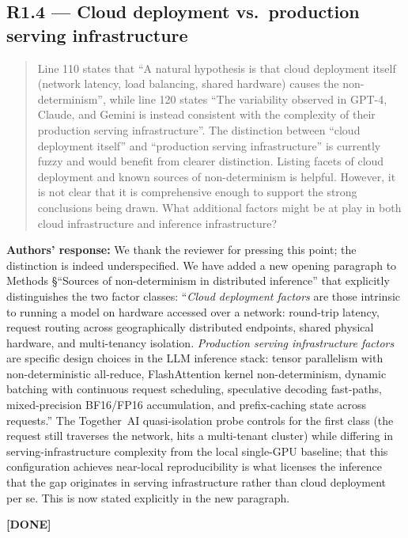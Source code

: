 \documentclass[11pt,a4paper]{article}
\newenvironment{revquote}{%
  \begin{quote}\small\itshape\color{revgray}
}{%
  \end{quote}
}
\newcommand{\response}[1]{\par\noindent\textbf{\color{revgreen}Authors' response:} #1\par}
\newcommand{\done}{\color{revgreen}\textbf{[DONE]}}
\begin{document}
\subsection*{R1.4 --- Cloud deployment vs.\ production serving infrastructure}

\begin{revquote}
Line 110 states that ``A natural hypothesis is that cloud deployment itself (network latency, load balancing, shared hardware) causes the non-determinism'', while line 120 states ``The variability observed in GPT-4, Claude, and Gemini is instead consistent with the complexity of their production serving infrastructure''. The distinction between ``cloud deployment itself'' and ``production serving infrastructure'' is currently fuzzy and would benefit from clearer distinction. Listing facets of cloud deployment and known sources of non-determinism is helpful. However, it is not clear that it is comprehensive enough to support the strong conclusions being drawn. What additional factors might be at play in both cloud infrastructure and inference infrastructure?
\end{revquote}

\response{We thank the reviewer for pressing this point; the distinction is indeed underspecified. We have added a new opening paragraph to Methods §``Sources of non-determinism in distributed inference'' that explicitly distinguishes the two factor classes: ``\emph{Cloud deployment factors} are those intrinsic to running a model on hardware accessed over a network: round-trip latency, request routing across geographically distributed endpoints, shared physical hardware, and multi-tenancy isolation. \emph{Production serving infrastructure factors} are specific design choices in the LLM inference stack: tensor parallelism with non-deterministic all-reduce, FlashAttention kernel non-determinism, dynamic batching with continuous request scheduling, speculative decoding fast-paths, mixed-precision BF16/FP16 accumulation, and prefix-caching state across requests.'' The Together~AI quasi-isolation probe controls for the first class (the request still traverses the network, hits a multi-tenant cluster) while differing in serving-infrastructure complexity from the local single-GPU baseline; that this configuration achieves near-local reproducibility is what licenses the inference that the gap originates in serving infrastructure rather than cloud deployment per se. This is now stated explicitly in the new paragraph.} \done
\end{document}
